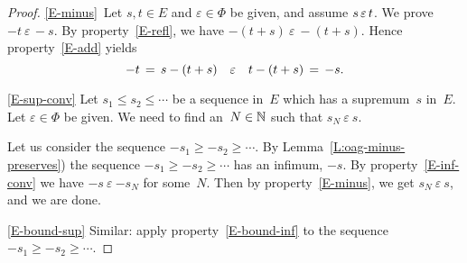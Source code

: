 \documentclass[main.tex]{subfiles}
\begin{document}
\begin{proof}
\noindent\ref{E-minus}\ 
Let $s,t\in E$ and $\varepsilon\in \Phi$ be given,
and assume $s\,\varepsilon\, t$.
We prove $-t\ \varepsilon\,-\!\!s$.
By property~\ref{E-refl},
we have $-(t+s) \ \varepsilon\ -(t+s)$.
Hence property~\ref{E-add} yields
\begin{equation*}
-t\,=\,s-(t+s)\quad\varepsilon\quad t-(t+s) \,=\,-s.
\end{equation*}

\noindent\ref{E-sup-conv}
Let $s_1 \leq s_2 \leq \dotsb$
be a sequence in~$E$
which has a supremum~$s$ in~$E$.
Let $\varepsilon \in \Phi$ be given.
We need to find an~$N\in\mathbb{N}$
such that $s_N \ \varepsilon\ s$.

Let us consider the sequence
$-s_1 \geq -s_2 \geq\dotsb$.
By Lemma~\ref{L:oag-minus-preserves})
the sequence $-s_1 \geq -s_2 \geq \dotsb$
has an infimum, $-s$.
By property~\ref{E-inf-conv}
we have 
$-s\ \varepsilon\ {-s_N}$
for some~$N$.
Then by property~\ref{E-minus},
we get $s_N\ \varepsilon\ s$,
and we are done.

\vspace{.3em}
\noindent\ref{E-bound-sup}
Similar:
apply property~\ref{E-bound-inf}
to the sequence $-s_1 \geq -s_2 \geq \dotsb$.
\end{proof}
\end{document}
